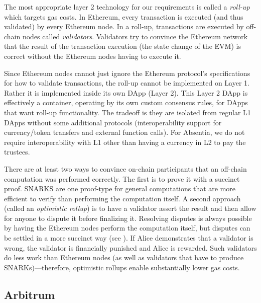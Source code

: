The most appropriate layer 2 technology for our requirements is called a \emph{roll-up} which targets gas costs. In Ethereum, every transaction is executed (and thus validated) by every Ethereum node. In a roll-up, transactions are executed by off-chain nodes called \emph{validators}. Validators try to convince the Ethereum network that the result of the transaction execution (\ie the state change of the EVM) is correct without the Ethereum nodes having to execute it. 

Since Ethereum nodes cannot just ignore the Ethereum protocol's specifications for how to validate transactions, the roll-up cannot be implemented on Layer 1. Rather it is implemented inside its own DApp (Layer 2). This Layer 2 DApp is effectively a container, operating by its own custom consensus rules, for DApps that want roll-up functionality. The tradeoff is they are isolated from regular L1 DApps without some additional protocols (\eg interoperability support for currency/token transfers and external function calls). For Absentia, we do not require interoperability with L1 other than having a currency in L2 to pay the trustees.

There are at least two ways to convince on-chain participants that an off-chain computation was performed correctly. The first is to prove it with a succinct proof. SNARKS are one proof-type for general computations that are more efficient to verify than performing the computation itself. A second approach (called an \emph{optimistic rollup}) is to have a validator assert the result and then allow for anyone to dispute it before finalizing it. Resolving disputes is always possible by having the Ethereum nodes perform the computation itself, but disputes can be settled in a more succinct way (see \cite{KGCWF18}). If Alice demonstrates that a validator is wrong, the validator is financially punished and Alice is rewarded. Such validators do less work than Ethereum nodes (as well as validators that have to produce SNARKs)---therefore, optimistic rollups enable substantially lower gas costs.

\subsection{Arbitrum}

